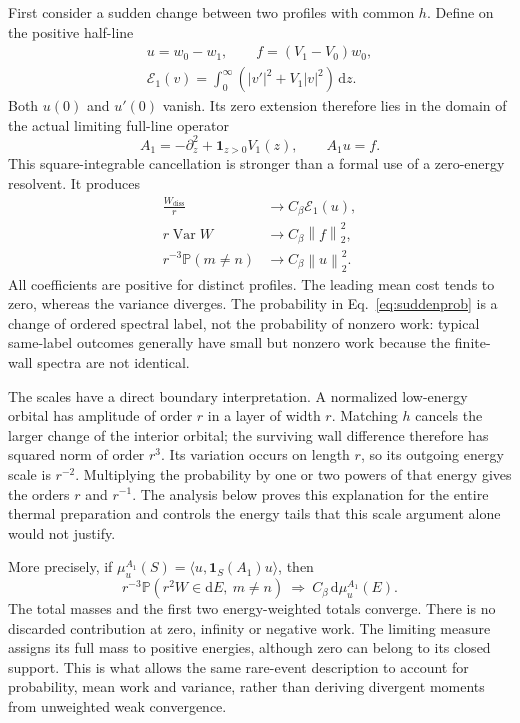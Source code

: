 \documentclass[aps,pra,reprint,superscriptaddress,longbibliography]{revtex4-2}
\newcommand{\dd}{\mathrm d}
\newcommand{\Var}{\operatorname{Var}}
\newcommand{\Wd}{W_{\mathrm{diss}}}
\newcommand{\Prob}{\mathbb P}
\newcommand{\calE}{\mathcal E}
\newcommand{\norm}[1]{\left\lVert#1\right\rVert}
\begin{document}
First consider a sudden change between two profiles with common $h$. Define on the positive half-line
\begin{equation}
 \begin{gathered}
 u=w_0-w_1,\qquad f=(V_1-V_0)w_0,\\
 \calE_1(v)=\int_0^\infty(|v'|^2+V_1|v|^2)\,\dd z.
 \end{gathered}
 \label{eq:mismatch}
\end{equation}
Both $u(0)$ and $u'(0)$ vanish. Its zero extension therefore lies in the domain of the actual limiting full-line operator
\begin{equation}
 A_1=-\partial_z^2+\mathbf1_{z>0}V_1(z),\qquad A_1u=f.
 \label{eq:fullop}
\end{equation}
This square-integrable cancellation is stronger than a formal use of a zero-energy resolvent. It produces
\begin{align}
 \frac{\Wd}{r}&\longrightarrow C_\beta\calE_1(u),\label{eq:suddenmean}\\
 r\Var W&\longrightarrow C_\beta\norm{f}_2^2,\label{eq:suddenvar}\\
 r^{-3}\Prob(m\ne n)&\longrightarrow C_\beta\norm{u}_2^2.
 \label{eq:suddenprob}
\end{align}
All coefficients are positive for distinct profiles. The leading mean cost tends to zero, whereas the variance diverges. The probability in Eq.~\eqref{eq:suddenprob} is a change of ordered spectral label, not the probability of nonzero work: typical same-label outcomes generally have small but nonzero work because the finite-wall spectra are not identical.

The scales have a direct boundary interpretation. A normalized low-energy orbital has amplitude of order $r$ in a layer of width $r$. Matching $h$ cancels the larger change of the interior orbital; the surviving wall difference therefore has squared norm of order $r^3$. Its variation occurs on length $r$, so its outgoing energy scale is $r^{-2}$. Multiplying the probability by one or two powers of that energy gives the orders $r$ and $r^{-1}$. The analysis below proves this explanation for the entire thermal preparation and controls the energy tails that this scale argument alone would not justify.

More precisely, if $\mu_u^{A_1}(S)=\langle u,\mathbf1_S(A_1)u\rangle$, then
\begin{equation}
 r^{-3}\Prob(r^2W\in\dd E,\ m\ne n)
       \ \Longrightarrow\ C_\beta\,\dd\mu_u^{A_1}(E).
 \label{eq:suddenlaw}
\end{equation}
The total masses and the first two energy-weighted totals converge. There is no discarded contribution at zero, infinity or negative work. The limiting measure assigns its full mass to positive energies, although zero can belong to its closed support. This is what allows the same rare-event description to account for probability, mean work and variance, rather than deriving divergent moments from unweighted weak convergence.
\end{document}
